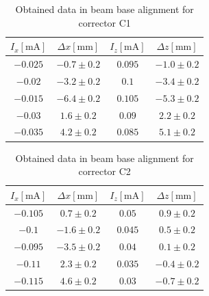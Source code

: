 \documentclass[12pt]{article}
\begin{document}
\begin{table}[H]
    \centering
    \begin{tabular}{c|c|c|c}
        \hline
        $I_x \mathrm{[mA]}$ &   $\Delta x \mathrm{[mm]}$ &$I_z \mathrm{[mA]}$ & $\Delta z \mathrm{[mm]}$ \\
        \hline
        \hline
        $ -0.025 $ & $ -0.7 \pm 0.2 $ & $ 0.095 $ & $ -1.0 \pm 0.2 $ \\ 
        $ -0.02 $ & $ -3.2 \pm 0.2 $ & $ 0.1 $ & $ -3.4 \pm 0.2 $ \\ 
        $ -0.015 $ & $ -6.4 \pm 0.2 $ & $ 0.105 $ & $ -5.3 \pm 0.2 $ \\ 
        $ -0.03 $ & $ 1.6 \pm 0.2 $ & $ 0.09 $ & $ 2.2 \pm 0.2 $ \\ 
        $ -0.035 $ & $ 4.2 \pm 0.2 $ & $ 0.085 $ & $ 5.1 \pm 0.2 $ \\  
    \end{tabular}
    \caption{Obtained data in beam base alignment for corrector C1}
    \label{BC1row}
\end{table}

\begin{table}[H]
    \centering
    \begin{tabular}{c|c|c|c}
        \hline
        \hline
        $I_x \mathrm{[mA]}$ &   $\Delta x \mathrm{[mm]}$ &$I_z \mathrm{[mA]}$ & $\Delta z \mathrm{[mm]}$ \\
        \hline
        
        $ -0.105 $ & $ 0.7 \pm 0.2 $ & $ 0.05 $ & $ 0.9 \pm 0.2 $ \\ 
        $ -0.1 $ & $ -1.6 \pm 0.2 $ & $ 0.045 $ & $ 0.5 \pm 0.2 $ \\ 
        $ -0.095 $ & $ -3.5 \pm 0.2 $ & $ 0.04 $ & $ 0.1 \pm 0.2 $ \\ 
        $ -0.11 $ & $ 2.3 \pm 0.2 $ & $ 0.035 $ & $ -0.4 \pm 0.2 $ \\ 
        $ -0.115 $ & $ 4.6 \pm 0.2 $ & $ 0.03 $ & $ -0.7 \pm 0.2 $ \\ 
        \hline
    \end{tabular}
    \caption{Obtained data in beam base alignment for corrector C2}
    \label{BC2row}
\end{table}
\end{document}
